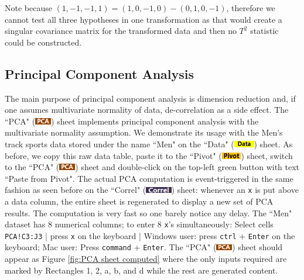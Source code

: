 \documentclass[article]{jss}
\numberwithin{equation}{subsection}
\newcommand{\shtData}{``Data" (\includegraphics[height=8pt, keepaspectratio=true]{DataSheetTab_png}) }
\newcommand{\shtPivot}{``Pivot" (\includegraphics[height=8pt, keepaspectratio=true]{PivotSheetTab_png}) }
\newcommand{\shtCorrel}{``Correl" (\includegraphics[height=8pt, keepaspectratio=true]{CorrelSheetTab_png}) }
\newcommand{\shtPCA}{``PCA" (\includegraphics[height=8pt, keepaspectratio=true]{PcaSheetTab_png}) }
\begin{document}
\begin{enumerate}
                
                Note because $(1,-1,-1,1) = (1,0,-1,0) - (0,1,0,-1)$, therefore we cannot test all three hypotheses in one transformation as that would create a singular covariance matrix for the transformed data and then no $T^2$ statistic could be constructed.
        
        \end{enumerate}
        
        
        
        \subsection[egPCA]{Principal Component Analysis}
        The main purpose of principal component analysis is dimension reduction and, if one assumes multivariate normality of data, de-correlation as a side effect. The \shtPCA sheet implements principal component analysis with the multivariate normality assumption.        
        We demonstrate its usage with the Men's track sports data stored under the name ``Men" on the \shtData sheet. As before, we copy this raw data table, paste it to the \shtPivot sheet, switch to the \shtPCA sheet and double-click on the top-left green button with text ``Paste from Pivot". The actual PCA computation is event-triggered in the same fashion as seen before on the \shtCorrel sheet: whenever an \texttt{x} is put above a data column, the entire sheet is regenerated to display a new set of PCA results. The computation is very fast so one barely notice any delay. The ``Men" dataset has 8 numerical columns; to enter 8 \texttt{x}'s simultaneously: Select cells \texttt{PCA!C3:J3} | press \texttt{x} on the keyboard | Windows user: press \texttt{ctrl} + \texttt{Enter} on the keyboard; Mac user: Press \texttt{command} + \texttt{Enter}. The \shtPCA sheet should appear as Figure \ref{fig:PCA sheet computed} where the only inputs required are marked by Rectangles 1, 2, a, b, and d while the rest are generated content.
\end{document}
